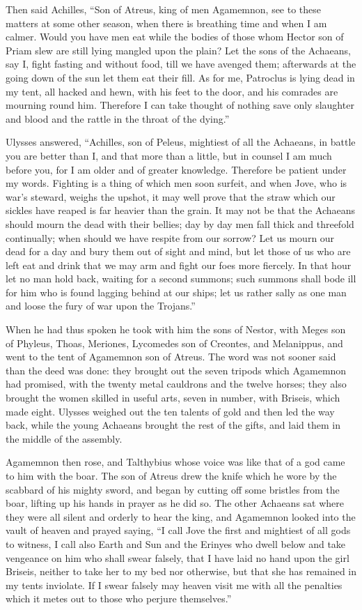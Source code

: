 Then said Achilles, “Son of Atreus, king of men Agamemnon, see to these
matters at some other season, when there is breathing time and when I am
calmer. Would you have men eat while the bodies of those whom Hector son
of Priam slew are still lying mangled upon the plain? Let the sons of the
Achaeans, say I, fight fasting and without food, till we have avenged
them; afterwards at the going down of the sun let them eat their fill. As
for me, Patroclus is lying dead in my tent, all hacked and hewn, with his
feet to the door, and his comrades are mourning round him. Therefore I can
take thought of nothing save only slaughter and blood and the rattle in
the throat of the dying.”

Ulysses answered, “Achilles, son of Peleus, mightiest of all the Achaeans,
in battle you are better than I, and that more than a little, but in
counsel I am much before you, for I am older and of greater knowledge.
Therefore be patient under my words. Fighting is a thing of which men soon
surfeit, and when Jove, who is war’s steward, weighs the upshot, it may
well prove that the straw which our sickles have reaped is far heavier
than the grain. It may not be that the Achaeans should mourn the dead with
their bellies; day by day men fall thick and threefold continually; when
should we have respite from our sorrow? Let us mourn our dead for a day
and bury them out of sight and mind, but let those of us who are left eat
and drink that we may arm and fight our foes more fiercely. In that hour
let no man hold back, waiting for a second summons; such summons shall
bode ill for him who is found lagging behind at our ships; let us rather
sally as one man and loose the fury of war upon the Trojans.”

When he had thus spoken he took with him the sons of Nestor, with Meges
son of Phyleus, Thoas, Meriones, Lycomedes son of Creontes, and
Melanippus, and went to the tent of Agamemnon son of Atreus. The word was
not sooner said than the deed was done: they brought out the seven tripods
which Agamemnon had promised, with the twenty metal cauldrons and the
twelve horses; they also brought the women skilled in useful arts, seven
in number, with Briseis, which made eight. Ulysses weighed out the ten
talents of gold and then led the way back, while the young Achaeans
brought the rest of the gifts, and laid them in the middle of the
assembly.

Agamemnon then rose, and Talthybius whose voice was like that of a god
came to him with the boar. The son of Atreus drew the knife which he wore
by the scabbard of his mighty sword, and began by cutting off some
bristles from the boar, lifting up his hands in prayer as he did so. The
other Achaeans sat where they were all silent and orderly to hear the
king, and Agamemnon looked into the vault of heaven and prayed saying, “I
call Jove the first and mightiest of all gods to witness, I call also
Earth and Sun and the Erinyes who dwell below and take vengeance on him
who shall swear falsely, that I have laid no hand upon the girl Briseis,
neither to take her to my bed nor otherwise, but that she has remained in
my tents inviolate. If I swear falsely may heaven visit me with all the
penalties which it metes out to those who perjure themselves.”

